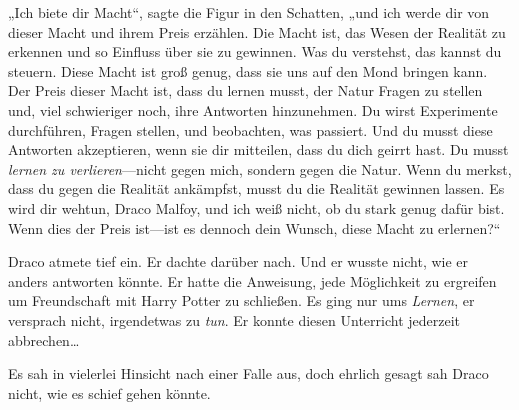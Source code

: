 „Ich biete dir Macht“, sagte die Figur in den Schatten, „und ich werde dir von dieser Macht und ihrem Preis erzählen. Die Macht ist, das Wesen der Realität zu erkennen und so Einfluss über sie zu gewinnen. Was du verstehst, das kannst du steuern. Diese Macht ist groß genug, dass sie uns auf den Mond bringen kann. Der Preis dieser Macht ist, dass du lernen musst, der Natur Fragen zu stellen und, viel schwieriger noch, ihre Antworten hinzunehmen. Du wirst Experimente durchführen, Fragen stellen, und beobachten, was passiert. Und du musst diese Antworten akzeptieren, wenn sie dir mitteilen, dass du dich geirrt hast. Du musst \emph{lernen zu verlieren}—nicht gegen mich, sondern gegen die Natur. Wenn du merkst, dass du gegen die Realität ankämpfst, musst du die Realität gewinnen lassen. Es wird dir wehtun, Draco Malfoy, und ich weiß nicht, ob du stark genug dafür bist. Wenn dies der Preis ist—ist es dennoch dein Wunsch, diese Macht zu erlernen?“

Draco atmete tief ein. Er dachte darüber nach. Und er wusste nicht, wie er anders antworten könnte. Er hatte die Anweisung, jede Möglichkeit zu ergreifen um Freundschaft mit Harry Potter zu schließen. Es ging nur ums \emph{Lernen}, er versprach nicht, irgendetwas zu \emph{tun}. Er konnte diesen Unterricht jederzeit abbrechen…

Es sah in vielerlei Hinsicht nach einer Falle aus, doch ehrlich gesagt sah Draco nicht, wie es schief gehen könnte.

